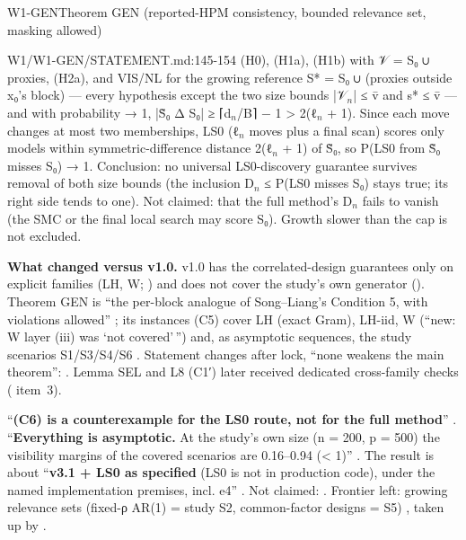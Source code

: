 \begin{card}{W1-GEN}{Theorem GEN (reported-HPM consistency, bounded relevance set, masking allowed)}
\begin{stmt}{W1/W1-GEN/STATEMENT.md:145-154}
(H0), (H1a), (H1b) with 𝒱 = S₀ ∪ proxies, (H2a), and VIS/NL for the growing reference S* = S₀ ∪ (proxies outside
x₀'s block) — every hypothesis except the two size bounds |𝒱$_{n}$| ≤ v̄ and s* ≤ v̄ — and with probability → 1,
|S̃₀ Δ S₀| ≥ ⌈d$_{n}$/B⌉ − 1 > 2(ℓ$_{n}$ + 1). Since each move changes at most two memberships, LS0 (ℓ$_{n}$ moves plus a final
scan) scores only models within symmetric-difference distance 2(ℓ$_{n}$ + 1) of S̃₀, so P(LS0 from S̃₀ misses S₀) → 1.
Conclusion: no universal LS0-discovery guarantee survives removal of both size bounds (the inclusion
D$_{n}$ ≤ P(LS0 misses S₀) stays true; its right side tends to one). Not claimed: that the full method's D$_{n}$ fails to
vanish (the SMC or the final local search may score S₀). Growth slower than the cap is not excluded.
\end{stmt}

\textbf{What changed versus v1.0.} v1.0 has the correlated-design guarantees only on explicit families (LH, W; ) and does not cover the study's own generator (). Theorem GEN is ``the per-block analogue of Song–Liang's Condition 5, with violations allowed'' ; its instances (C5) cover LH (exact Gram), LH-iid, W (``new: W layer (iii) was `not covered'\,'') and, as asymptotic sequences, the study scenarios S1/S3/S4/S6 . Statement changes after lock, ``none weakens the main theorem'': . Lemma SEL and L8 (C1′) later received dedicated cross-family checks ( item~3).

\begin{notproved}
``\textbf{(C6) is a counterexample for the LS0 route, not for the full method}'' . ``\textbf{Everything is asymptotic.} At the study's own size (n = 200, p = 500) the visibility margins of the covered scenarios are 0.16–0.94 (< 1)'' . The result is about ``\textbf{v3.1 + LS0 as specified} (LS0 is not in production code), under the named implementation premises, incl. e4'' . Not claimed: . Frontier left: growing relevance sets (fixed-ρ AR(1) = study S2, common-factor designs = S5) , taken up by .
\end{notproved}
\end{card}

